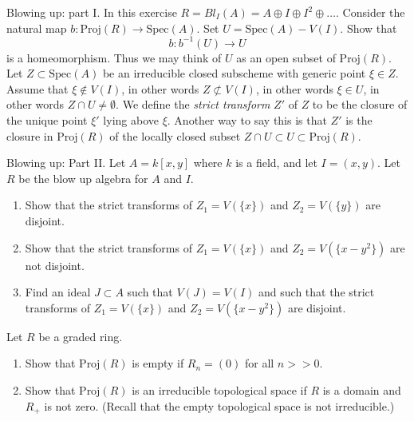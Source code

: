 \begin{exercise}
\label{exercise-blowing-up-I}
Blowing up: part I.
In this exercise $R = Bl_I(A) = A \oplus I \oplus I^2 \oplus \ldots$.
Consider the natural map $b : \text{Proj}(R) \to \text{Spec}(A)$.
Set $U = \text{Spec}(A) - V(I)$. Show that
$$
b : b^{-1}(U) \longrightarrow U
$$
is a homeomorphism.
Thus we may think of $U$ as an open subset of $\text{Proj}(R)$.
Let $Z \subset \text{Spec}(A)$ be an irreducible closed subscheme
with generic point $\xi \in Z$. Assume that $\xi \not\in V(I)$,
in other words $Z \not\subset V(I)$, in other words
$\xi \in U$, in other words $Z\cap U \not = \emptyset$. We define
the {\it strict transform} $Z'$ of $Z$ to be the closure of the unique
point $\xi'$ lying above $\xi$. Another way to say this is that
$Z'$ is the closure in $\text{Proj}(R)$ of the locally closed subset
$Z\cap U \subset U \subset \text{Proj}(R)$.
\end{exercise}

\begin{exercise}
\label{exercise-blowing-up-II}
Blowing up: Part II.
Let $A = k[x, y]$ where $k$ is a field, and let $I = (x, y)$.
Let $R$ be the blow up algebra for $A$ and $I$.
\begin{enumerate}
\item Show that the strict transforms of $Z_1 = V(\{x\})$ and
$Z_2 = V(\{y\})$ are disjoint.
\item Show that the strict transforms of $Z_1 = V(\{x\})$ and
$Z_2 = V(\{x-y^2\})$ are not disjoint.
\item Find an ideal $J \subset A$ such that $V(J) = V(I)$
and such that the strict transforms of $Z_1 = V(\{x\})$ and
$Z_2 = V(\{x-y^2\})$ are disjoint.
\end{enumerate}
\end{exercise}

\begin{exercise}
\label{exercise-proj-when-empty}
Let $R$ be a graded ring.
\begin{enumerate}
\item Show that $\text{Proj}(R)$ is empty if $R_n = (0)$ for all $n >> 0$.
\item Show that $\text{Proj}(R)$ is an irreducible topological space
if $R$ is a domain and $R_{+}$ is not zero. (Recall that the empty
topological space is not irreducible.)
\end{enumerate}
\end{exercise}

